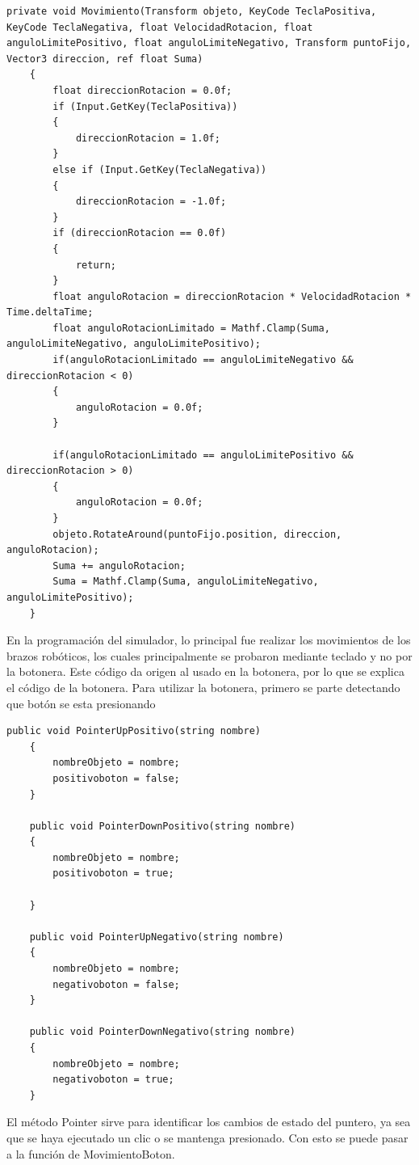\begin{lstlisting}[frame=single]
    private void Movimiento(Transform objeto, KeyCode TeclaPositiva, KeyCode TeclaNegativa, float VelocidadRotacion, float anguloLimitePositivo, float anguloLimiteNegativo, Transform puntoFijo, Vector3 direccion, ref float Suma)
    {
        float direccionRotacion = 0.0f;
        if (Input.GetKey(TeclaPositiva))
        {
            direccionRotacion = 1.0f;
        }
        else if (Input.GetKey(TeclaNegativa))
        {
            direccionRotacion = -1.0f;
        }
        if (direccionRotacion == 0.0f)
        {
            return;
        }
        float anguloRotacion = direccionRotacion * VelocidadRotacion * Time.deltaTime;
        float anguloRotacionLimitado = Mathf.Clamp(Suma, anguloLimiteNegativo, anguloLimitePositivo);
        if(anguloRotacionLimitado == anguloLimiteNegativo && direccionRotacion < 0)
        {
            anguloRotacion = 0.0f;
        }

        if(anguloRotacionLimitado == anguloLimitePositivo && direccionRotacion > 0)
        {
            anguloRotacion = 0.0f;
        }
        objeto.RotateAround(puntoFijo.position, direccion, anguloRotacion);
        Suma += anguloRotacion;
        Suma = Mathf.Clamp(Suma, anguloLimiteNegativo, anguloLimitePositivo);
    }
\end{lstlisting}
En la programación del simulador, lo principal fue realizar los movimientos de los brazos robóticos, los cuales principalmente se probaron mediante teclado y no por la botonera. Este código da origen al usado en la botonera, por lo que se explica el código de la botonera.
\clearpage
Para utilizar la botonera, primero se parte detectando que botón se esta presionando

\begin{lstlisting}[frame=single]
    public void PointerUpPositivo(string nombre)
    {
        nombreObjeto = nombre;
        positivoboton = false;
    }

    public void PointerDownPositivo(string nombre)
    {
        nombreObjeto = nombre;
        positivoboton = true;
        
    }

    public void PointerUpNegativo(string nombre)
    {
        nombreObjeto = nombre;
        negativoboton = false;
    }

    public void PointerDownNegativo(string nombre)
    {
        nombreObjeto = nombre;
        negativoboton = true;
    }
\end{lstlisting}
El método Pointer sirve para identificar los cambios de estado del puntero, ya sea que se haya ejecutado un clic o se mantenga presionado.
Con esto se puede pasar a la función de MovimientoBoton.

